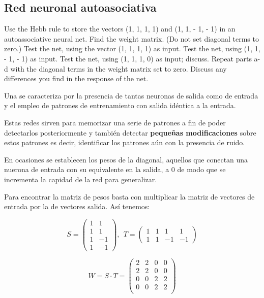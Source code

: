 \subsection{Red neuronal autoasociativa}

\begin{problem}[8]
Use the Hebb rule to store the vectors (1, 1, 1, 1) and (1, 1, - 1, - 1) in an autoassociative neural net.
\ppart Find the weight matrix. (Do not set diagonal terms to zero.)
\ppart Test the net, using the vector (1, 1, 1, 1) as input.
\ppart Test the net, using (1, 1, - 1, - 1) as input.
\ppart Test the net, using (1, 1, 1, 0) as input; discuss.
\ppart Repeat parts a-d with the diagonal terms in the weight matrix set to zero. Discuss any differences you find in the response of the net.

\solution

Una  se caracteriza por la presencia de tantas neuronas de salida como de entrada y el empleo de patrones de entrenamiento con salida idéntica a la entrada.

Estas redes sirven para memorizar una serie de patrones a fin de poder detectarlos posteriormente y también detectar \textbf{pequeñas modificaciones} sobre estos patrones es decir, identificar los patrones aún con la presencia de ruido.

En ocasiones se establecen los pesos de la diagonal, aquellos que conectan una nuerona de entrada con su equivalente en la salida, a 0 de modo que se incrementa la capidad de la red para generalizar.

\spart

Para encontrar la matriz de pesos basta con multiplicar la matriz de vectores de entrada por la de vectores salida. Así tenemos:

\[S = \left( \begin{array}{cc}
1 & 1 \\
1 & 1 \\
1 & -1 \\
1 & -1
\end{array}\right), \ \ T = \left( \begin{array}{cccc}
1 & 1 & 1 & 1 \\
1 & 1 & -1 & -1
\end{array}\right)\]

\[W = S\cdot T = \left( \begin{array}{cccc}
2 & 2 & 0 & 0 \\
2 & 2 & 0 & 0 \\
0 & 0 & 2 & 2 \\
0 & 0 & 2 & 2 \\
\end{array}\right)\]


\end{problem}
